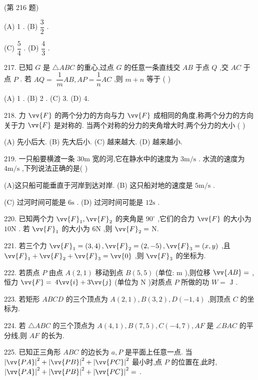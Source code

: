 (第 216 题)

(A) 1 . (B) $\dfrac{3}{2}$ .

(C) $\dfrac{5}{4}$ . (D) $\dfrac{4}{3}$ .

217. 已知 $G$ 是 $\bigtriangleup {ABC}$ 的重心,过点 $G$ 的任意一条直线交 ${AB}$ 于点 $Q$ ,交 ${AC}$ 于点 $P$ . 若 ${AQ} =$  $\dfrac{1}{m}{AB},{AP} = \dfrac{1}{n}{AC}$ ,则 $m + n$ 等于 (   )

(A) 1 . (B) 2 . (C) 3. (D) 4.

218. 力 $\vv{F}$ 的两个分力的方向与力 $\vv{F}$ 成相同的角度,称两个分力的方向关于力 $\vv{F}$ 是对称的. 当两个对称的分力的夹角增大时,两个分力的大小 (   )

(A) 先小后大. (B) 先大后小. (C) 越来越大. (D) 越来越小.

219. 一只船要横渡一条 ${30}\mathrm{m}$ 宽的河,它在静水中的速度为 $3\mathrm{m}/\mathrm{s}$ . 水流的速度为 $4\mathrm{m}/\mathrm{s}$ ,下列说法正确的是(   )

(A)这只船可能垂直于河岸到达对岸. (B) 这只船对地的速度是 $5\mathrm{m}/\mathrm{s}$ .

(C) 过河时间可能是 $6\mathrm{s}$ . (D) 过河时间可能是 ${12}\mathrm{s}$ .

220. 已知两个力 ${\vv{F}}_{1},{\vv{F}}_{2}$ 的夹角是 ${90}^{ \circ  }$ ,它们的合力 $\vv{F}$ 的大小为 ${10}\mathrm{N}$ . 若 ${\vv{F}}_{1}$ 的大小为 $6\mathrm{N}$ ,则 ${\vv{F}}_{2} =$ \blkda{}N.

221. 若三个力 ${\vv{F}}_{1} = \left( {3,4}\right) ,{\vv{F}}_{2} = \left( {2, - 5}\right) ,{\vv{F}}_{3} = \left( {x,y}\right)$ ,且 ${\vv{F}}_{1} + {\vv{F}}_{2} + {\vv{F}}_{3} = \vv{0}$ ,则 ${\vv{F}}_{3}$ 的坐标为\blkda{}.

222. 若质点 $P$ 由点 $A\left( {2,1}\right)$ 移动到点 $B\left( {5,5}\right)$ (单位: $\mathrm{m}$ ),则位移 $\vv{AB} =$ \blkda{},恒力 $\vv{F} =$  $4\vv{i} + 3\vv{j}$ (单位为 $\mathrm{N}$ )对质点 $P$ 所做的功 $W =$ \blkda{} $\mathrm{J}$ .

223. 若矩形 ${ABCD}$ 的三个顶点为 $A\left( {2,1}\right) ,B\left( {3,2}\right) ,D\left( {-1,4}\right)$ ,则顶点 $C$ 的坐标为\blkda{}.

224. 若 $\bigtriangleup {ABC}$ 的三个顶点为 $A\left( {4,1}\right) ,B\left( {7,5}\right) ,C\left( {-4,7}\right) ,{AF}$ 是 $\angle {BAC}$ 的平分线,则 ${AF}$ 的长为\blkda{}.

225. 已知正三角形 ${ABC}$ 的边长为 $a,P$ 是平面上任意一点. 当 ${\left| \vv{PA}\right| }^{2} + {\left| \vv{PB}\right| }^{2} + {\left| \vv{PC}\right| }^{2}$ 最小时,点 $P$ 的位置在\blkda{},此时, ${\left| \vv{PA}\right| }^{2} + {\left| \vv{PB}\right| }^{2} + {\left| \vv{PC}\right| }^{2} =$ \blkda{}.

